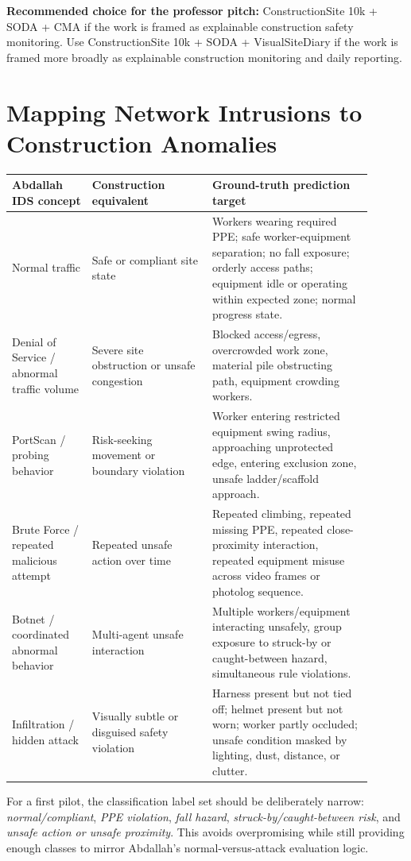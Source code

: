 \documentclass[10pt]{article}
\begin{document}
\textbf{Recommended choice for the professor pitch:} ConstructionSite 10k + SODA + CMA if the work is framed as explainable construction safety monitoring. Use ConstructionSite 10k + SODA + VisualSiteDiary if the work is framed more broadly as explainable construction monitoring and daily reporting.

\section{Mapping Network Intrusions to Construction Anomalies}
\begin{longtable}{L{0.20\linewidth} L{0.30\linewidth} L{0.40\linewidth}}
\toprule
\textbf{Abdallah IDS concept} & \textbf{Construction equivalent} & \textbf{Ground-truth prediction target} \\
\midrule
\endhead
Normal traffic & Safe or compliant site state & Workers wearing required PPE; safe worker-equipment separation; no fall exposure; orderly access paths; equipment idle or operating within expected zone; normal progress state. \\
\midrule
Denial of Service / abnormal traffic volume & Severe site obstruction or unsafe congestion & Blocked access/egress, overcrowded work zone, material pile obstructing path, equipment crowding workers. \\
\midrule
PortScan / probing behavior & Risk-seeking movement or boundary violation & Worker entering restricted equipment swing radius, approaching unprotected edge, entering exclusion zone, unsafe ladder/scaffold approach. \\
\midrule
Brute Force / repeated malicious attempt & Repeated unsafe action over time & Repeated climbing, repeated missing PPE, repeated close-proximity interaction, repeated equipment misuse across video frames or photolog sequence. \\
\midrule
Botnet / coordinated abnormal behavior & Multi-agent unsafe interaction & Multiple workers/equipment interacting unsafely, group exposure to struck-by or caught-between hazard, simultaneous rule violations. \\
\midrule
Infiltration / hidden attack & Visually subtle or disguised safety violation & Harness present but not tied off; helmet present but not worn; worker partly occluded; unsafe condition masked by lighting, dust, distance, or clutter. \\
\bottomrule
\end{longtable}

For a first pilot, the classification label set should be deliberately narrow: \textit{normal/compliant}, \textit{PPE violation}, \textit{fall hazard}, \textit{struck-by/caught-between risk}, and \textit{unsafe action or unsafe proximity}. This avoids overpromising while still providing enough classes to mirror Abdallah's normal-versus-attack evaluation logic.
\end{document}
